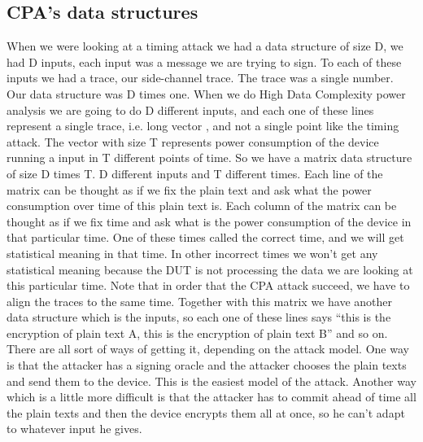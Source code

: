 \subsection{CPA's data structures}\label{c8_CPA_data_structures:subsec}
When we were looking at a timing attack we had a data structure of size D, we had D inputs, each input was a message we are trying to sign. To each of these inputs we had a trace, our side-channel trace. The trace was a single number. Our data structure was D times one.
When we do High Data Complexity power analysis we are going to do D different inputs, and each one of these lines represent a single trace, i.e. long vector , and not a single point like the timing attack. The vector with size T represents power consumption of the device running a input in T different points of time. So we have a matrix data structure of size D times T. D different inputs and T different times.
Each line of the matrix can be thought as if we fix the plain text and ask what the power consumption over time of this plain text is.
Each column of the matrix can be thought as if we fix time and ask what is the power consumption of the device in that particular time.
One of these times called the correct time, and we will get statistical meaning in that time. In other incorrect times we won't get any statistical meaning because the DUT is not processing the data we are looking at this particular time.
Note that in order that the CPA attack succeed, we have to align the traces to the same time.
Together with this matrix we have another data structure which is the inputs, so each one of these lines says “this is the encryption of plain text A, this is the encryption of plain text B” and so on. There are all sort of ways of getting it, depending on the attack model. One way is that the attacker has a signing oracle and the attacker chooses the plain texts and send them to the device. This is the easiest model of the attack. Another way which is a little more difficult is that the attacker has to commit ahead of time all the plain texts and then the device encrypts them all at once, so he can’t adapt to whatever input he gives.

